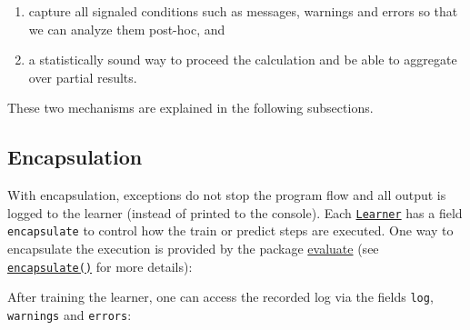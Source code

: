 \documentclass[
]{scrbook}
\newenvironment{Shaded}{\begin{snugshade}}{\end{snugshade}}
\newcommand{\AttributeTok}[1]{\textcolor[rgb]{0.77,0.63,0.00}{#1}}
\newcommand{\DecValTok}[1]{\textcolor[rgb]{0.00,0.00,0.81}{#1}}
\newcommand{\FunctionTok}[1]{\textcolor[rgb]{0.00,0.00,0.00}{#1}}
\newcommand{\NormalTok}[1]{#1}
\newcommand{\OtherTok}[1]{\textcolor[rgb]{0.56,0.35,0.01}{#1}}
\newcommand{\SpecialCharTok}[1]{\textcolor[rgb]{0.00,0.00,0.00}{#1}}
\newcommand{\StringTok}[1]{\textcolor[rgb]{0.31,0.60,0.02}{#1}}
\providecommand{\tightlist}{%
  \setlength{\itemsep}{0pt}\setlength{\parskip}{0pt}}
\renewenvironment{Shaded} {\begin{snugshade}\small} {\end{snugshade}}
\begin{document}
\begin{enumerate}
\def\labelenumi{\arabic{enumi}.}
\tightlist
\item
  capture all signaled conditions such as messages, warnings and errors so that we can analyze them post-hoc, and
\item
  a statistically sound way to proceed the calculation and be able to aggregate over partial results.
\end{enumerate}

These two mechanisms are explained in the following subsections.

\hypertarget{encapsulation}{%
\subsection{Encapsulation}\label{encapsulation}}

With encapsulation, exceptions do not stop the program flow and all output is logged to the learner (instead of printed to the console).
Each \href{https://mlr3.mlr-org.com/reference/Learner.html}{\texttt{Learner}} has a field \texttt{encapsulate} to control how the train or predict steps are executed.
One way to encapsulate the execution is provided by the package \href{https://cran.r-project.org/package=evaluate}{evaluate} (see \href{https://mlr3misc.mlr-org.com/reference/encapsulate.html}{\texttt{encapsulate()}} for more details):

\begin{Shaded}
\end{Shaded}

After training the learner, one can access the recorded log via the fields \texttt{log}, \texttt{warnings} and \texttt{errors}:
\end{document}
